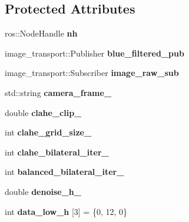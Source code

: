 \subsection*{Protected Attributes}
\begin{DoxyCompactItemize}
\item 
\mbox{\label{classBuoy_ad94fe9e5a32dfbffbf5538277b28e809}} 
ros\+::\+Node\+Handle {\bfseries nh}
\item 
\mbox{\label{classBuoy_a391e658428c21fa5d7af57cd7a3fc664}} 
image\+\_\+transport\+::\+Publisher {\bfseries blue\+\_\+filtered\+\_\+pub}
\item 
\mbox{\label{classBuoy_a1f023c4f4e8e92e97babd731d19c5901}} 
image\+\_\+transport\+::\+Subscriber {\bfseries image\+\_\+raw\+\_\+sub}
\item 
\mbox{\label{classBuoy_ad8a61f22312a2af443d491f6d8a95c88}} 
std\+::string {\bfseries camera\+\_\+frame\+\_\+}
\item 
\mbox{\label{classBuoy_a832c660d31a540d9fcc17c7f3d8f68d8}} 
double {\bfseries clahe\+\_\+clip\+\_\+}
\item 
\mbox{\label{classBuoy_aa47cb1503c015132f210dfc713749a72}} 
int {\bfseries clahe\+\_\+grid\+\_\+size\+\_\+}
\item 
\mbox{\label{classBuoy_aca1a7c7645c39831707746a8b9bb6992}} 
int {\bfseries clahe\+\_\+bilateral\+\_\+iter\+\_\+}
\item 
\mbox{\label{classBuoy_a76c480b4d7d16f9ec58a50d99c64a46e}} 
int {\bfseries balanced\+\_\+bilateral\+\_\+iter\+\_\+}
\item 
\mbox{\label{classBuoy_ab6587d9953014573ed5b89aebb989d61}} 
double {\bfseries denoise\+\_\+h\+\_\+}
\item 
\mbox{\label{classBuoy_a481fc15e25346fd346a14f2bff84a55f}} 
int {\bfseries data\+\_\+low\+\_\+h} \mbox{[}3\mbox{]} = \{0, 12, 0\}
\item 
\mbox{\label{classBuoy_aabf668782fb78cd57c57935f5556f9a7}} 

\end{DoxyCompactItemize}

